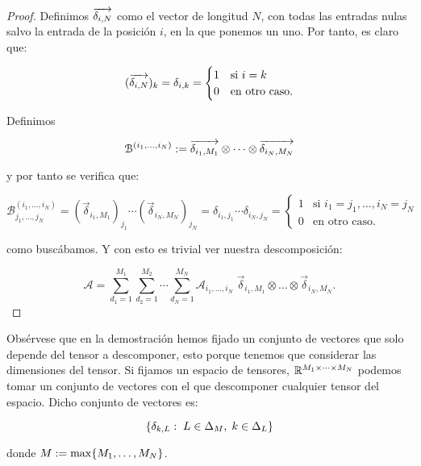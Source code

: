 \begin{proof}
	Definimos $\overrightarrow{\delta_{i, N}}$ como el vector de longitud $N$, con todas las entradas nulas salvo la entrada de la posición $i$, en la que ponemos un uno. Por tanto, es claro que:

	\begin{equation}
		(\overrightarrow{\delta_{i, N}})_k =  \delta_{i, k} =
		\begin{cases}
			1 & \text{si } i = k    \\
			0 & \text{en otro caso}.
		\end{cases}
	\end{equation}

	Definimos

	\begin{equation}
		\mathcal{B}^{(i_1, \ldots, i_N)} := \overrightarrow{\delta_{i_1, M_1}} \otimes \cdots \otimes \overrightarrow{\delta_{i_N, M_N}}
	\end{equation}

	y por tanto se verifica que:

	\begin{equation}
		\mathcal{B}^{(i_1, \ldots, i_N)}_{j_1, \ldots, j_N} = (\vec{\delta}_{i_1, M_1})_{j_1} \cdots (\vec{\delta}_{i_N, M_N})_{j_N} = \delta_{i_1, j_1} \cdots \delta_{i_N, j_N} =
		\begin{cases}
			1 & \text{si } i_1 = j_1, \ldots, i_N = j_N \\
			0 & \text{en otro caso}.
		\end{cases}
	\end{equation}

	como buscábamos. Y con esto es trivial ver nuestra descomposición:

	\begin{equation}
		\mathcal{A} = \sum_{d_1 = 1}^{M_1} \sum_{d_2 = 1}^{M_2} \cdots \sum_{d_N = 1}^{M_N} \mathcal{A}_{i_1, \ldots, i_N} \; \vec{\delta}_{i_1, M_1} \otimes \ldots \otimes \vec{\delta}_{i_N, M_N}.
	\end{equation}
\end{proof}

\begin{observacion} \label{observacion:descomposicion_cp_conjunta}

	Obsérvese que en la demostración hemos fijado un conjunto de vectores que solo depende del tensor a descomponer, esto porque tenemos que considerar las dimensiones del tensor. Si fijamos un espacio de tensores, $\mathbb{R}^{M_1 \times \cdots \times M_N}$ podemos tomar un conjunto de vectores con el que descomponer cualquier tensor del espacio. Dicho conjunto de vectores es:

	\begin{equation}
		\{ \delta_{k, L}: \; L \in \Delta_{M}, \; k \in \Delta_{L} \}
	\end{equation}

	donde $M := \max \{ M_1, \ldots, M_N \}$.

\end{observacion}

